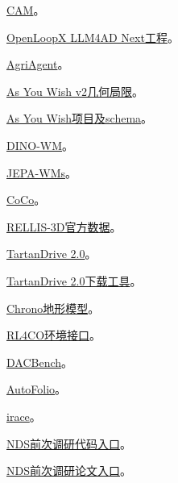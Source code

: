 \documentclass[11pt,a4paper]{article}
\newcommand{\referencetext}[1]{{\fontsize{9.4}{14.2}\selectfont#1\par}}
\begin{document}
\referencetext{[ER35] \href{https://proceedings.mlr.press/v306/feng26o.html}{CAM}。}
\referencetext{[ER36] \href{https://github.com/Optima-CityU/LLM4AD\_Next}{OpenLoopX LLM4AD Next工程}。}
\referencetext{[ER37] \href{https://arxiv.org/html/2601.08308v1}{AgriAgent}。}
\referencetext{[ER38] \href{https://arxiv.org/html/2606.18519v2\#S4.SS3}{As You Wish v2几何局限}。}
\referencetext{[ER39] \href{https://ucmercedrobotics.github.io/asUwish.html}{As You Wish项目及schema}。}
\referencetext{[ER40] \href{https://arxiv.org/pdf/2411.04983}{DINO-WM}。}
\referencetext{[ER41] \href{https://arxiv.org/html/2512.24497v1}{JEPA-WMs}。}
\referencetext{[ER42] \href{https://arxiv.org/html/2608.04653v1}{CoCo}。}
\referencetext{[ER43] \href{https://github.com/unmannedlab/RELLIS-3D}{RELLIS-3D官方数据}。}
\referencetext{[ER44] \href{https://theairlab.org/TartanDrive2/}{TartanDrive 2.0}。}
\referencetext{[ER45] \href{https://github.com/castacks/tartan\_drive\_2.0}{TartanDrive 2.0下载工具}。}
\referencetext{[ER46] \href{https://api.projectchrono.org/vehicle\_terrain.html}{Chrono地形模型}。}
\referencetext{[ER47] \href{https://rl4co.ai4co.org/docs/content/api/envs/base/}{RL4CO环境接口}。}
\referencetext{[ER48] \href{https://github.com/automl/DACBench}{DACBench}。}
\referencetext{[ER49] \href{https://github.com/automl/AutoFolio}{AutoFolio}。}
\referencetext{[ER50] \href{https://mlopez-ibanez.github.io/irace/}{irace}。}
\referencetext{[ER51] \href{https://github.com/ahottung/NDS}{NDS前次调研代码入口}。}
\referencetext{[ER52] \href{https://arxiv.org/abs/2501.03715}{NDS前次调研论文入口}。}
\end{document}
